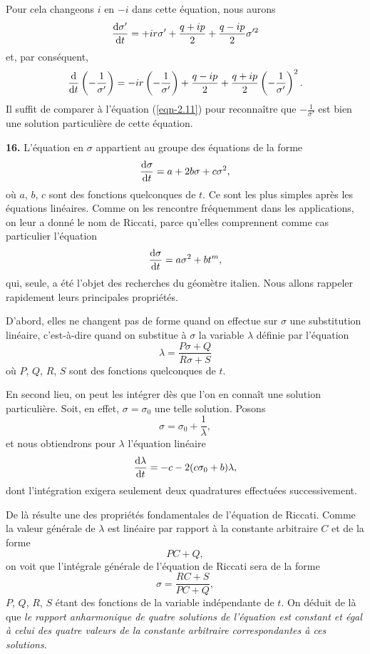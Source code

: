 Pour cela changeons $i$ en $-i$ dans cette équation, nous aurons
\[
	\frac{\operatorname{d}\!{\sigma'}}{\operatorname{d}\!{t}} = + ir\sigma' + \frac{q+ ip}{2} + \frac{q - ip}{2}\sigma'^2
\]
et, par conséquent,
\[
	\frac{\operatorname{d}\!{}}{\operatorname{d}\!{t}}\left(-\frac{1}{\sigma'}\right) = -ir\left(-\frac{1}{\sigma'}\right) + \frac{q - ip}{2} + \frac{q 
	+ ip}{2}\left(-\frac{1}{\sigma'}\right)^2.
\]
Il suffit de comparer à l'équation (\ref{eqn-2.11}) pour reconnaître que $-\frac{1}{\sigma'}$ est bien une solution 
particulière de cette équation.

\textbf{16.} L'équation en $\sigma$ appartient au groupe des équations de la forme
\begin{equation}
	\frac{\operatorname{d}\!{\sigma}}{\operatorname{d}\!{t}} = a + 2b\sigma + c\sigma^2,
	\label{eqn-2.13}
\end{equation}
où $a$, $b$, $c$ sont des fonctions quelconques de $t$. Ce sont les plus simples après les équations linéaires. Comme 
on les rencontre fréquemment dans les applications, on leur a donné le nom de Riccati, parce qu'elles comprennent comme 
cas particulier l'équation
\[
	\frac{\operatorname{d}\!{\sigma}}{\operatorname{d}\!{t}} = a\sigma^2 + bt^m,
\]
qui, seule, a été l'objet des recherches du géomètre italien. Nous allons rappeler rapidement leurs principales 
propriétés.

D'abord, elles ne changent pas de forme quand on effectue sur $\sigma$ une substitution linéaire, c'est-à-dire quand on 
substitue à $\sigma$ la variable $\lambda$ définie par l'équation
\[
	\lambda = \frac{P\sigma + Q}{R\sigma + S}
\]
où $P$, $Q$, $R$, $S$ sont des fonctions quelconques de $t$.

En second lieu, on peut les intégrer dès que l'on en connaît une solution particulière. Soit, en effet, 
$\sigma=\sigma_0$ une telle solution. Posons
\[
	\sigma = \sigma_0 + \frac{1}{\lambda},
\]
et nous obtiendrons pour $\lambda$ l'équation linéaire
\begin{equation}
	\frac{\operatorname{d}\!{\lambda}}{\operatorname{d}\!{t}} = -c -2(c\sigma_0 + b)\lambda,
	\label{eqn-2.14}
\end{equation}
dont l'intégration exigera seulement deux quadratures effectuées successivement.

De là résulte une des propriétés fondamentales de l'équation de Riccati. Comme la valeur générale de $\lambda$ est 
linéaire par rapport à la constante arbitraire $C$ et de la forme
\[
	PC + Q,
\]
on voit que l'intégrale générale de l'équation de Riccati sera de la forme
\[
	\sigma = \frac{RC + S}{PC + Q},
\]
$P$, $Q$, $R$, $S$ étant des fonctions de la variable indépendante de $t$. On déduit de là que \textit{le rapport 
anharmonique de quatre solutions de l'équation est constant et égal à celui des quatre valeurs de la constante 
arbitraire correspondantes à ces solutions}.